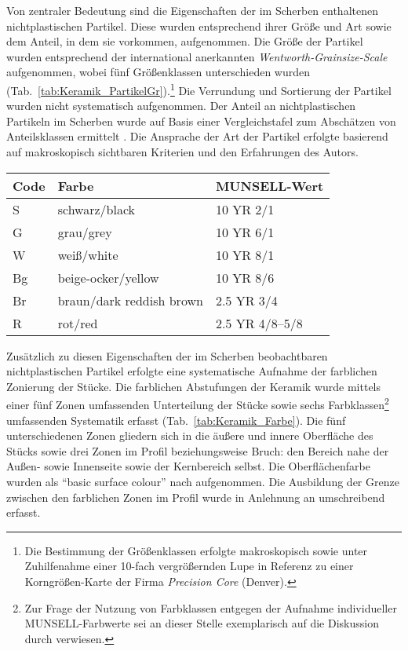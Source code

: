 \noindent Von zentraler Bedeutung sind die Eigenschaften der im Scherben enthaltenen nichtplastischen Partikel. Diese wurden entsprechend ihrer Größe und Art sowie dem Anteil, in dem sie vorkommen, aufgenommen. Die Größe der Partikel wurden entsprechend der international anerkannten \textit{Wentworth-Grainsize-Scale} \parencite[381 Tab.~1, 388 Abb.~3]{Wentworth.1922} aufgenommen, wobei fünf Größenklassen unterschieden wurden (Tab.~\ref{tab:Keramik_PartikelGr}).\footnote{Die Bestimmung der Größenklassen erfolgte makroskopisch sowie unter Zuhilfenahme einer 10-fach vergrößernden Lupe in Referenz zu einer Korngrößen-Karte der Firma \textit{Precision Core} (Denver).} Die Verrundung und Sortierung der Partikel wurden nicht systematisch aufgenommen. Der Anteil an nichtplastischen Partikeln im Scherben wurde auf Basis einer Vergleichstafel zum Abschätzen von Anteilsklassen ermittelt \parencites[Tab.~\ref{tab:Keramik_PartikelDichte}; ][32]{Kinne.2009}[nach][]{Hodgson.1976}. Die Ansprache der Art der Partikel erfolgte basierend auf makroskopisch sichtbaren Kriterien und den Erfahrungen des Autors.

\begin{table*}[tb]
	\centering
	{\small
		\begin{tabular}{@{}lll@{}}
			\toprule
			\textbf{Code} & \textbf{Farbe} & \textbf{MUNSELL-Wert} \\
			\midrule
			S & schwarz/black & 10 YR 2/1 \\
			G & grau/grey & 10 YR 6/1 \\
			W & weiß/white & 10 YR 8/1 \\
			Bg & beige-ocker/yellow & 10 YR 8/6 \\
			Br & braun/dark reddish brown & 2.5 YR 3/4 \\
			R & rot/red & 2.5 YR 4/8--5/8 \\
			\bottomrule
	\end{tabular}}
	\caption{Keramik: Farben der Scherbenoberflächen und -brüche.}
	\label{tab:Keramik_Farbe}
\end{table*}

Zusätzlich zu diesen Eigenschaften der im Scherben beobachtbaren nichtplastischen Partikel erfolgte eine systematische Aufnahme der farblichen Zonierung der Stücke. Die farblichen Abstufungen der Keramik wurde mittels einer fünf Zonen umfassenden Unterteilung der Stücke sowie sechs Farbklassen\footnote{Zur Frage der Nutzung von Farbklassen entgegen der Aufnahme individueller MUNSELL-Farbwerte sei an dieser Stelle exemplarisch auf die Diskussion durch \textcite[38]{Keding.1997} verwiesen.} umfassenden Systematik erfasst (Tab.~\ref{tab:Keramik_Farbe}). Die fünf unterschiedenen Zonen gliedern sich in die äußere und innere Oberfläche des Stücks sowie drei Zonen im Profil beziehungsweise Bruch: den Bereich nahe der Außen- sowie Innenseite sowie der Kernbereich selbst. Die Oberflächenfarbe wurden als \enquote{basic surface colour} nach \textcite[44ff.]{Nordstrom.1972} aufgenommen. Die Ausbildung der Grenze zwischen den farblichen Zonen im Profil wurde in Anlehnung an \parencite[27]{Kinne.2009} umschreibend erfasst.

